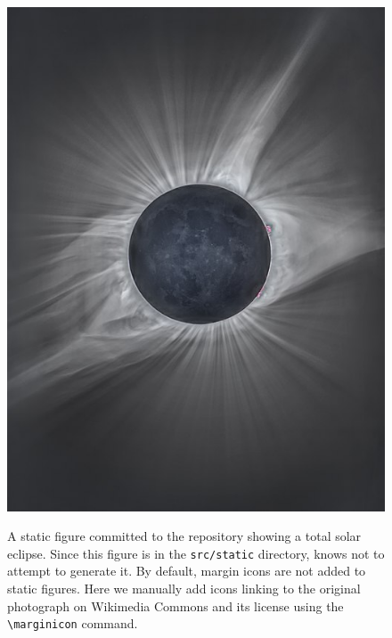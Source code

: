 \documentclass[twocolumn]{aastex631}
\begin{document}
\begin{figure}[ht!]
    \begin{centering}
        \includegraphics[width=0.75\linewidth]{static/eclipse.jpeg}
        \caption{
            A static figure committed to the repository showing a total solar eclipse. 
            Since this figure is in the \texttt{src/static} directory, \showyourwork knows not to attempt to generate it. 
            By default, margin icons are not added to static figures.
            Here we manually add icons linking to the original photograph on Wikimedia Commons and its license using the \texttt{\textbackslash marginicon} command.
        }
        \label{fig:eclipse}
    \end{centering}
\end{figure}
\end{document}
